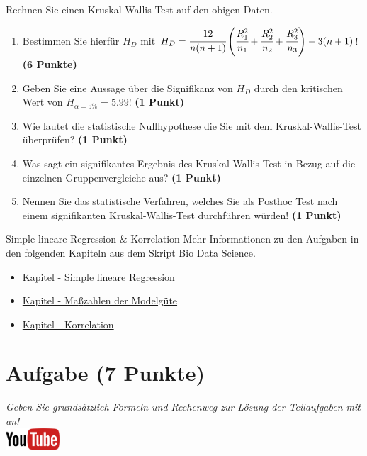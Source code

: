 \documentclass[a4paper, 9pt]{scrartcl}\usepackage[]{graphicx}\usepackage[]{xcolor}
\begin{document}
Rechnen Sie einen Kruskal-Wallis-Test auf den obigen Daten.

\begin{enumerate}
\item Bestimmen Sie hierf{\"u}r $H_D$ mit $H_D=
  \cfrac{12}{n(n+1)}\left(\cfrac{R_1^2}{n_1}+\cfrac{R_2^2}{n_2}
    + \cfrac{R_3^2}{n_3}\right)
  - 3(n+1)$! \textbf{(6 Punkte)} 
\item Geben Sie eine Aussage {\"u}ber die Signifikanz von $H_D$ durch
  den kritischen Wert von $H_{\alpha = 5\%} = 5.99$! \textbf{(1 Punkt)}
\item Wie lautet die statistische Nullhypothese die Sie mit dem Kruskal-Wallis-Test
  {\"u}berpr{\"u}fen? \textbf{(1 Punkt)}
\item Was sagt ein signifikantes Ergebnis des Kruskal-Wallis-Test in Bezug
  auf die einzelnen Gruppenvergleiche aus? \textbf{(1 Punkt)}
\item Nennen Sie das statistische Verfahren, welches Sie als Posthoc Test
  nach einem signifikanten Kruskal-Wallis-Test durchf{\"u}hren w{\"u}rden! \textbf{(1 Punkt)}
\end{enumerate} 
\clearpage
\begin{graybox}{Simple lineare Regression \& Korrelation}
Mehr Informationen zu den Aufgaben in den folgenden Kapiteln aus dem Skript Bio Data Science.
  \begin{itemize}
  \item \href{https://jkruppa.github.io/stat-linear-reg-basic.html}{Kapitel - Simple lineare Regression}
  \item \href{https://jkruppa.github.io/stat-linear-reg-quality.html}{Kapitel - Ma{\ss}zahlen der Modelg{\"u}te}
  \item \href{https://jkruppa.github.io/stat-linear-reg-corr.html}{Kapitel - Korrelation}
  \end{itemize}
\end{graybox}
\clearpage

\section{Aufgabe \hfill (7 Punkte)}

\textit{Geben Sie grunds{\"a}tzlich Formeln und Rechenweg zur L{\"o}sung der
  Teilaufgaben mit an!} \\[1Ex]

\hfill\href{https://youtu.be/2dUJcYK9RgU}{\includegraphics[width =
  2cm]{img/youtube}}\\[1Ex]
\end{document}
